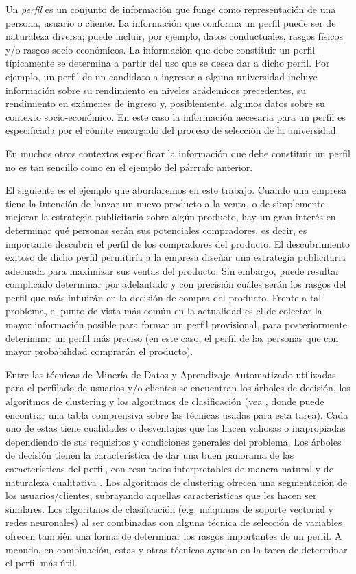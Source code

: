 \documentclass[letterpaper,11pt]{article}
\begin{document}
\begin{multicols}{2}
Un \emph{perfil} es un conjunto de información que funge como representación de una persona, usuario o cliente\cite{cufo}. La información que
conforma un perfil puede ser de naturaleza diversa; puede incluir, por ejemplo, datos conductuales, rasgos físicos y/o rasgos
socio-económicos. La información que debe constituir un perfil típicamente se determina a partir del uso que
se desea dar a dicho perfil. Por ejemplo, un perfil de un candidato a ingresar a alguna universidad
incluye información sobre su rendimiento en niveles acádemicos precedentes, su rendimiento en exámenes de ingreso y, 
posiblemente, algunos datos sobre su contexto socio-económico. En este caso la información necesaria para un perfil es
especificada por el cómite encargado del proceso de selección de la universidad. 

En muchos otros contextos especificar la información que debe constituir un perfil no es tan sencillo como en
el ejemplo del párrrafo anterior. 

El siguiente es el ejemplo que abordaremos en este trabajo. Cuando una empresa tiene la intención de lanzar un nuevo
producto a la venta, o de simplemente mejorar la estrategia publicitaria sobre algún producto, 
hay un gran interés en determinar qué personas serán sus potenciales compradores, es decir, es importante descubrir el perfil de los compradores 
del producto. El descubrimiento exitoso de dicho perfil permitiría a la empresa diseñar una estrategia publicitaria adecuada
para maximizar sus ventas del producto. Sin embargo, puede resultar
complicado determinar por adelantado y con precisión cuáles serán los rasgos del perfil que más influirán en la decisión
de compra del producto. Frente a tal problema, el punto de vista más común en la actualidad es el de colectar la mayor información posible para
formar un perfil provisional, para posteriormente determinar un perfil más
preciso (en este caso, el perfil de las personas que con mayor probabilidad comprarán el producto). 

Entre las técnicas de Minería de Datos y Aprendizaje Automatizado
utilizadas para el perfilado de usuarios y/o clientes se encuentran los árboles de decisión,
los algoritmos de clustering y los  algoritmos de clasificación (vea \cite{mah}, donde  puede encontrar una tabla
comprensiva sobre las técnicas usadas para esta tarea). Cada uno de estas tiene cualidades o desventajas que las hacen valiosas o
inapropiadas dependiendo de sus requisitos y condiciones generales del problema. Los árboles de decisión tienen la característica de 
dar una buen panorama de las características del perfil, con
resultados interpretables de manera natural y de naturaleza cualitativa \cite[Cap. 6]{berry}. Los algoritmos de clustering ofrecen
una segmentación de los usuarios/clientes, subrayando aquellas características que les hacen ser similares. Los algoritmos de clasificación 
(e.g. máquinas de soporte vectorial y redes neuronales) al ser combinadas con alguna técnica de selección de variables
ofrecen también una forma de determinar los rasgos importantes de un perfil. A menudo, en combinación, estas y otras
técnicas ayudan en la tarea de determinar el perfil más útil.



\end{multicols}
\end{document}
